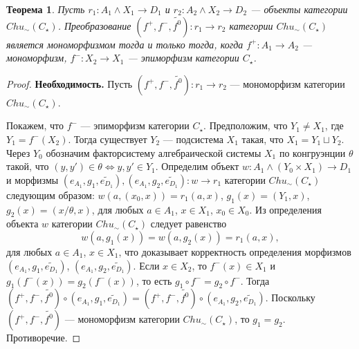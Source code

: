 \documentclass[a4paper,12pt]{article}
\newtheorem{theorem}{Теорема}
\newcommand{\fo}{\widetilde{f^0}}
\begin{document}
\begin{theorem}\label{monomorphism-c}
    Пусть $r_1: A_1 \wedge X_1 \to D_1$ и $r_2: A_2 \wedge X_2 \to D_2$ --- объекты категории $Chu_\sim(C_\star)$. Преобразование $(f^+,f^-,\fo): r_1 \to r_2$ категории $Chu_\sim(C_\star)$ является мономорфизмом тогда и только тогда, когда $f^+: A_1 \to A_2$ --- мономорфизм, $f^-: X_2 \to X_1$ --- эпиморфизм категории $C_\star$.
\end{theorem}
\begin{proof}
    \textbf{Необходимость.} Пусть $(f^+,f^-,\fo): r_1 \to r_2$ --- мономорфизм категории $Chu_\sim(C_\star)$.

    Покажем, что $f^-$ --- эпиморфизм категории $C_\star$. Предположим, что $Y_1 \ne X_1$, где $Y_1 = f^-(X_2)$. Тогда существует $Y_2$ --- подсистема $X_1$ такая, что $X_1 = Y_1 \sqcup Y_2$. Через $Y_0$ обозначим факторсистему алгебраической системы $X_1$ по конгруэнции $\theta$ такой, что $(y,y') \in \theta \Leftrightarrow y, y' \in Y_1$. Определим объект $w: A_1 \wedge (Y_0 \times X_1) \to D_1$ и морфизмы $(e_{A_1},g_1,\widetilde{e_{D_1}}), (e_{A_1},g_2,\widetilde{e_{D_1}}): w \to r_1$ категории $Chu_\sim(C_\star)$ следующим образом: $w(a,(x_0,x)) = r_1(a,x)$, $g_1(x) = (Y_1,x)$, $g_2(x) = (x/\theta, x)$, для любых $a \in A_1$, $x \in X_1$, $x_0 \in X_0$. Из определения объекта $w$ категории $Chu_\sim(C_\star)$ следует равенство
    $$
        w(a,g_1(x)) = w(a,g_2(x)) = r_1(a,x),
    $$ 
    для любых $a \in A_1$, $x \in X_1$, что доказывает корректность определения морфизмов $(e_{A_1},g_1,\widetilde{e_{D_1}})$, $(e_{A_1},g_2,\widetilde{e_{D_1}})$. Если $x \in X_2$, то $f^-(x) \in X_1$ и $g_1(f^-(x)) = g_2(f^-(x))$, то есть $g_1 \circ f^- = g_2 \circ f^-$. Тогда $(f^+,f^-,\fo) \circ (e_{A_1},g_1,\widetilde{e_{D_1}}) = (f^+,f^-,\fo) \circ (e_{A_1},g_2,\widetilde{e_{D_1}})$. Поскольку $(f^+,f^-,\fo)$ --- мономорфизм категории $Chu_\sim(C_\star)$, то $g_1 = g_2$. Противоречие.


\end{proof}
\end{document}
